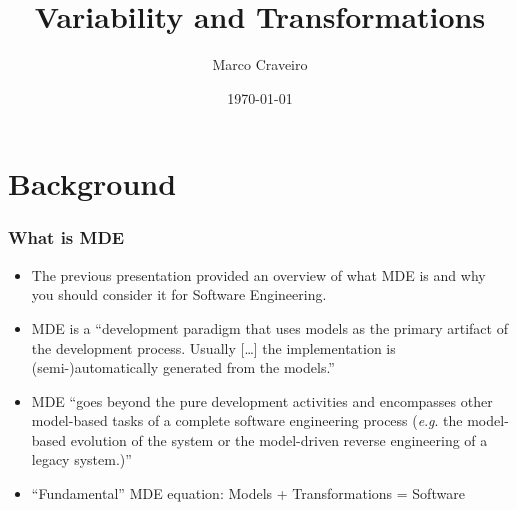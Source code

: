 \documentclass{beamer}
\title{Variability and Transformations}
\author{Marco Craveiro}
\date{\today}
\newcommand{\eg}{\textit{e}.\textit{g}. }
\begin{document}

\section{Background}

\begin{frame}
\frametitle{What is \ac{MDE}}

\begin{itemize}
\item The previous presentation provided an overview of what \ac{MDE}
  is and why you should consider it for Software Engineering.

\pause

\item \ac{MDE} is a ``development paradigm that uses models as the
  primary artifact of the development process. Usually [\ldots] the
  implementation is (semi-)automatically generated from the
  models.''\cite{brambilla2012model}

\pause

\item \ac{MDE} ``goes beyond the pure development activities and
  encompasses other model-based tasks of a complete software
  engineering process (\eg the model-based evolution of the system or
  the model-driven reverse engineering of a legacy
  system.)''\cite{brambilla2012model}

\pause

\item ``Fundamental'' \ac{MDE} equation: Models + Transformations =
  Software

\end{itemize}

\end{frame}
\end{document}
